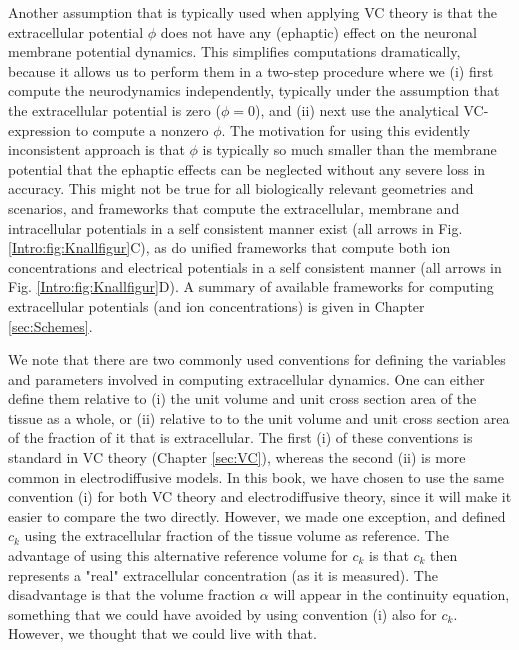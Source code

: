 Another assumption that is typically used when applying VC theory is that the extracellular potential $\phi$ does not have any (ephaptic) effect on the neuronal membrane potential dynamics. This simplifies computations dramatically, because it allows us to perform them in a two-step procedure where we (i) first compute the neurodynamics independently, typically under the assumption that the extracellular potential is zero ($\phi = 0$), and (ii) next use the analytical VC-expression to compute a nonzero $\phi$. The motivation for using this evidently inconsistent approach is that $\phi$ is typically so much smaller than the membrane potential that the ephaptic effects can be neglected without any severe loss in accuracy. This might not be true for all biologically relevant geometries and scenarios, and frameworks that compute the extracellular, membrane and intracellular potentials in a self consistent manner exist (all arrows in Fig. \ref{Intro:fig:Knallfigur}C), as do unified frameworks that compute both ion concentrations and electrical potentials in a self consistent manner (all arrows in Fig. \ref{Intro:fig:Knallfigur}D). A summary of available frameworks for computing extracellular potentials (and ion concentrations) is given in Chapter \ref{sec:Schemes}.

We note that there are two commonly used conventions for defining the variables and parameters involved in computing extracellular dynamics. One can either define them relative to (i) the unit volume and unit cross section area of the tissue as a whole, or (ii) relative to to the unit volume and unit cross section area of the fraction of it that is extracellular. The first (i) of these conventions is standard in VC theory (Chapter \ref{sec:VC}), whereas the second (ii) is more common in electrodiffusive models. In this book, we have chosen to use the same convention (i) for both VC theory and electrodiffusive theory, since it will make it easier to compare the two directly. However, we made one exception, and defined $c_k$ using the extracellular fraction of the tissue volume as reference. The advantage of using this alternative reference volume for $c_k$ is that $c_k$ then represents a "real" extracellular concentration (as it is measured). The disadvantage is that the volume fraction $\alpha$ will appear in the continuity equation, something that we could have avoided by using convention (i) also for $c_k$. However, we thought that we could live with that.



